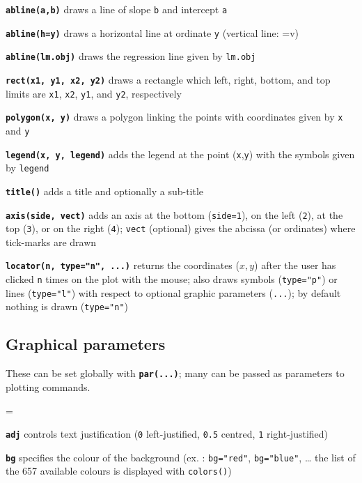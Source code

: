 \documentclass[8pt,landscape]{article}
\newcommand{\code}{\texttt}
\newcommand{\bcode}[1]{\texttt{\textbf{#1}}}
\begin{document}
\begin{multicols*}{3}
\bcode{abline(a,b)}  draws a line of slope \code{b} and intercept \code{a}

\bcode{abline(h=y)}  draws a horizontal line at ordinate \code{y} (vertical line: =v)


\bcode{abline(lm.obj)}  draws the regression line given by \code{lm.obj}

\bcode{rect(x1, y1, x2, y2)}  draws a rectangle which left, right, bottom, and top limits are \code{x1}, \code{x2}, \code{y1}, and \code{y2}, respectively

\bcode{polygon(x, y)}  draws a polygon linking the points with coordinates given by \code{x} and \code{y}

\bcode{legend(x, y, legend)}  adds the legend at the point (\code{x},\code{y}) with the symbols given by \code{legend}

\bcode{title()}  adds a title and optionally a sub-title

\bcode{axis(side, vect)}  adds an axis at the bottom (\code{side=1}), on the left (\code{2}), at the top (\code{3}), or on the right (\code{4}); \code{vect} (optional) gives the abcissa (or ordinates) where tick-marks are drawn


\smallskip

\bcode{locator(n, type="n", ...)}  returns the coordinates ($x,y$) after the user has clicked \code{n} times on the plot with the mouse; also draws symbols (\code{type="p"}) or lines (\code{type="l"}) with respect to optional graphic parameters (\code{...}); by default nothing is drawn (\code{type="n"})



\bigskip

\subsection{Graphical parameters}

These can be set globally with \bcode{par(...)}; many can be passed as
parameters to plotting commands.

\everypar={\hangindent=9mm}

\bcode{adj}  controls text justification (\code{0} left-justified, \code{0.5} centred, \code{1} right-justified)

\bcode{bg}  specifies the colour of the background (ex. : \code{bg="red"}, \code{bg="blue"}, \ldots{} the list of the 657 available colours is displayed with \code{colors()})


\end{multicols*}
\end{document}
